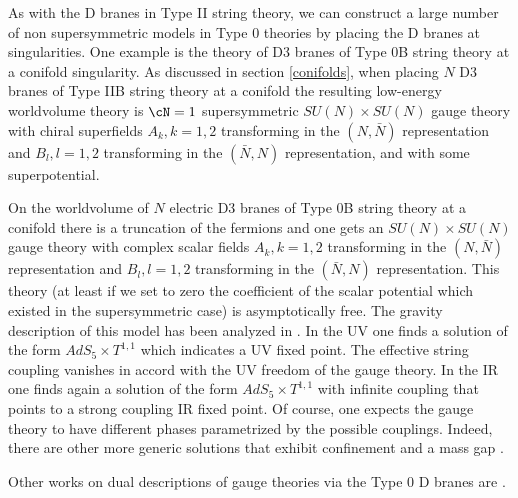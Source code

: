 As with the D branes in Type II string theory, we can 
construct a large number of non supersymmetric
models in Type 0 theories by placing the D branes at singularities.
One example is the theory of
D3 branes of Type 0B string theory at a conifold singularity.
As discussed in section \ref{conifolds},
when placing $N$ D3 branes of Type IIB string theory at a conifold
the resulting low-energy worldvolume theory is $\cN=1$ supersymmetric
$SU(N) \times SU(N)$ gauge theory  
with chiral superfields $A_k,k=1,2$ transforming in the $(N,\bar{N})$
representation and $B_l, l=1,2$ transforming in the $(\bar{N},N)$ 
representation, and with some superpotential.


On the worldvolume of $N$ electric D3 branes of Type 0B string theory
at a conifold there is a truncation of the fermions and one gets an
$SU(N) \times SU(N)$ gauge theory with complex scalar fields
$A_k,k=1,2$ transforming in the $(N,\bar{N})$ representation and $B_l,
l=1,2$ transforming in the $(\bar{N},N)$ representation.  This theory
(at least if we set to zero the coefficient of the scalar potential
which existed in the supersymmetric case) is asymptotically free.  The
gravity description of this model has been analyzed in
\cite{Mohsen:1999ba}.  In the UV one finds a solution of the form
$AdS_5 \times T^{1,1}$ which indicates a UV fixed point.  The
effective string coupling vanishes in accord with the UV freedom of
the gauge theory.  In the IR one finds again a solution of the form
$AdS_5 \times T^{1,1}$ with infinite coupling that points to a strong
coupling IR fixed point.  Of course, one expects the gauge theory to
have different phases parametrized by the possible couplings.  Indeed,
there are other more generic solutions that exhibit confinement and
a mass gap \cite{Mohsen:1999ba}.

Other works on dual descriptions of gauge theories via the Type 0 D branes
are \cite{Ferretti:1998xu,Zarembo:1999hn,Kogan:1999gi,%
Tseytlin:1999ii,Armoni:1999fb,%
Ferretti:1999gj,Costa:1999qx}.
\newpage











